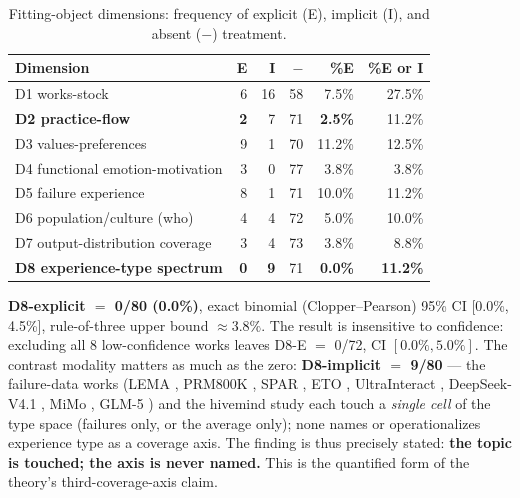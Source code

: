 \documentclass[10pt]{article}
\newcommand{\dminus}{-}
\begin{document}
\begin{table}[t]
\centering
\caption{Fitting-object dimensions: frequency of explicit (E), implicit (I), and absent ($\dminus$) treatment.}
\label{tab:dimensions}
\begin{tabular}{lrrrrr}
\toprule
Dimension & E & I & $\dminus$ & \%E & \%E or I \\
\midrule
D1 works-stock                        & 6 & 16 & 58 & 7.5\%  & 27.5\% \\
\textbf{D2 practice-flow}             & \textbf{2} & 7 & 71 & \textbf{2.5\%} & 11.2\% \\
D3 values-preferences                 & 9 & 1  & 70 & 11.2\% & 12.5\% \\
D4 functional emotion-motivation      & 3 & 0  & 77 & 3.8\%  & 3.8\% \\
D5 failure experience                 & 8 & 1  & 71 & 10.0\% & 11.2\% \\
D6 population/culture (who)           & 4 & 4  & 72 & 5.0\%  & 10.0\% \\
D7 output-distribution coverage       & 3 & 4  & 73 & 3.8\%  & 8.8\% \\
\textbf{D8 experience-type spectrum}  & \textbf{0} & \textbf{9} & 71 & \textbf{0.0\%} & \textbf{11.2\%} \\
\bottomrule
\end{tabular}
\end{table}

\textbf{D8-explicit $=$ 0/80 (0.0\%)}, exact binomial (Clopper--Pearson) 95\% CI [0.0\%, 4.5\%], rule-of-three upper bound $\approx 3.8\%$. The result is insensitive to confidence: excluding all 8 low-confidence works leaves D8-E $=$ 0/72, CI $[0.0\%, 5.0\%]$. The contrast modality matters as much as the zero: \textbf{D8-implicit $=$ 9/80} --- the failure-data works (LEMA \cite{an2023lema}, PRM800K \cite{lightman2024verify}, SPAR \cite{spar2026f26}, ETO \cite{song2024trial}, UltraInteract \cite{yuan2024advancing}, DeepSeek-V4.1 \cite{deepseek2026v41}, MiMo \cite{xiaomi2026mimo}, GLM-5 \cite{zai2026glm5}) and the hivemind study \cite{jiang2025hivemind} each touch a \emph{single cell} of the type space (failures only, or the average only); none names or operationalizes experience type as a coverage axis. The finding is thus precisely stated: \textbf{the topic is touched; the axis is never named.} This is the quantified form of the theory's third-coverage-axis claim.
\end{document}
